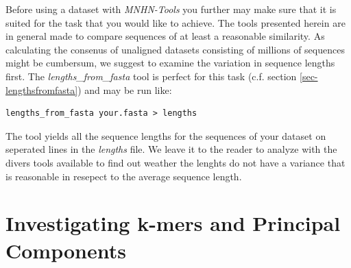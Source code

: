 Before using a dataset with \emph{MNHN-Tools} you further may make
sure that it is suited for the task that you would like to
achieve. The tools presented herein are in general made to
compare sequences of at least a reasonable similarity. As calculating
the consenus of unaligned datasets consisting of millions of
sequences might be cumbersum, we suggest to
examine the variation in sequence lengths first. The
\emph{lengths\_from\_fasta} tool is perfect for this task (c.f. section
\ref{sec-lengthsfromfasta}) and may be run like:
\begin{lstlisting}
lengths_from_fasta your.fasta > lengths
\end{lstlisting}
The tool yields all the sequence lengths for the sequences of your
dataset on seperated lines in the \emph{lengths} file. We leave it to
the reader to analyze with the divers tools available to find out weather
the lenghts do not have a variance that is reasonable in resepect to
the average sequence length. 

\section{Investigating k-mers and Principal Components}

